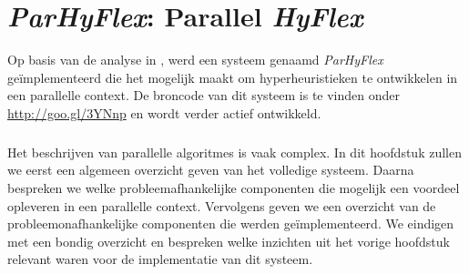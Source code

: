 \chapter{\emph{ParHyFlex}: Parallel \emph{HyFlex}}


Op basis van de analyse in , werd een systeem genaamd \emph{ParHyFlex} ge\"implementeerd die het mogelijk maakt om hyperheuristieken te ontwikkelen in een parallelle context. De broncode van dit systeem is te vinden onder \mbox{\url{http://goo.gl/3YNnp}} en wordt verder actief ontwikkeld.

\paragraph{}
Het beschrijven van parallelle algoritmes is vaak complex. In dit hoofdstuk zullen we eerst een algemeen overzicht geven van het volledige systeem. Daarna bespreken we welke probleemafhankelijke componenten die mogelijk een voordeel opleveren in een parallelle context. Vervolgens geven we een overzicht van de probleemonafhankelijke componenten die werden ge\"implementeerd. We eindigen met een bondig overzicht en bespreken welke inzichten uit het vorige hoofdstuk relevant waren voor de implementatie van dit systeem.







%

